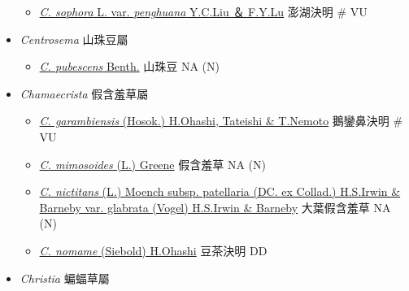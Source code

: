\begin{itemize}
  \begin{itemize}
        \item[] \href{http://www.theplantlist.org/tpl1.1/search?q=Cassia+sophora+var.+penghuana}{\textit{C. sophora} L. var. \textit{penghuana} Y.C.Liu ＆ F.Y.Lu}   澎湖決明  \# VU
  \end{itemize}
 \item[] \textit{Centrosema} 山珠豆屬
                                
  \begin{itemize}
        \item[] \href{http://www.theplantlist.org/tpl1.1/search?q=Centrosema+pubescens}{\textit{C. pubescens} Benth.}   山珠豆   NA (N)
  \end{itemize}
 \item[] \textit{Chamaecrista} 假含羞草屬
                                
  \begin{itemize}
        \item[] \href{http://www.theplantlist.org/tpl1.1/search?q=Chamaecrista+garambiensis}{\textit{C. garambiensis} (Hosok.) H.Ohashi, Tateishi \& T.Nemoto}   鵝鑾鼻決明  \# VU
        \item[] \href{http://www.theplantlist.org/tpl1.1/search?q=Chamaecrista+mimosoides}{\textit{C. mimosoides} (L.) Greene}   假含羞草   NA (N)
        \item[] \href{http://www.theplantlist.org/tpl1.1/search?q=Chamaecrista+nictitans+subsp.+patellaria+var.+glabrata}{\textit{C. nictitans} (L.) Moench subsp. patellaria (DC. ex Collad.) H.S.Irwin \& Barneby var. glabrata (Vogel) H.S.Irwin \& Barneby}   大葉假含羞草   NA (N)
        \item[] \href{http://www.theplantlist.org/tpl1.1/search?q=Chamaecrista+nomame}{\textit{C. nomame} (Siebold) H.Ohashi}   豆茶決明   DD
  \end{itemize}
 \item[] \textit{Christia} 蝙蝠草屬
                                

\end{itemize}

